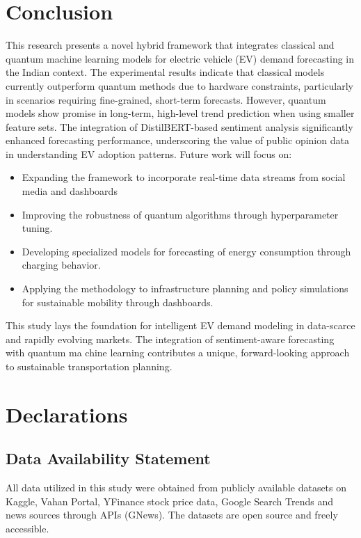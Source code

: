 \documentclass[pdflatex,sn-mathphys-num]{sn-jnl}%
\begin{document}
\section{Conclusion}\label{sec5}
This research presents a novel hybrid framework that integrates classical and quantum machine learning models for electric vehicle (EV) demand forecasting in the Indian context. The experimental results indicate that classical models currently outperform quantum methods due to hardware constraints, particularly in scenarios requiring fine-grained, short-term forecasts. However, quantum models show promise in long-term, high-level trend prediction when using smaller feature sets. The integration of DistilBERT-based sentiment analysis significantly enhanced forecasting performance, underscoring the value of public opinion data in understanding EV adoption patterns.
Future work will focus on:
\begin{itemize}
    \item Expanding the framework to incorporate real-time data streams from social media and dashboards
    \item Improving the robustness of quantum algorithms through hyperparameter tuning.
    \item Developing specialized models for forecasting of energy consumption through charging behavior.
    \item Applying the methodology to infrastructure planning and policy simulations for sustainable mobility through dashboards.
\end{itemize}
This study lays the foundation for intelligent EV demand modeling in data-scarce and rapidly evolving markets. The integration of sentiment-aware forecasting with quantum ma chine learning contributes a unique, forward-looking approach to sustainable transportation planning.

\section*{Declarations}

\subsection*{Data Availability Statement}
All data utilized in this study were obtained from publicly available datasets on Kaggle, Vahan Portal, YFinance stock price data, Google Search Trends and news sources through APIs (GNews). The datasets are open source and freely accessible.
\end{document}

